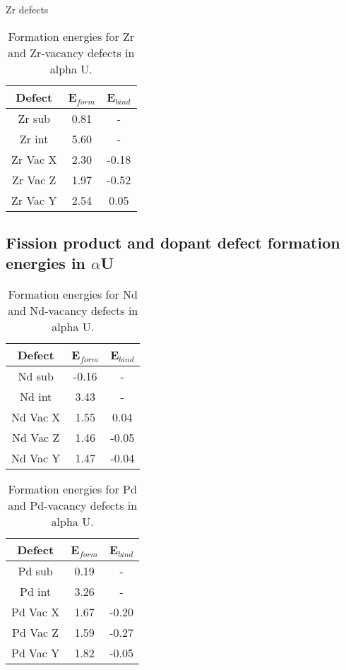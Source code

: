 \documentclass[review]{elsarticle}
\begin{document}
Zr defects

\begin{table}[h!]
\caption{Formation energies for Zr and Zr-vacancy defects in alpha U.}
\label{tab:Eforms}
\begin{center}
\begin{tabular}{|c|c|c|}
     \hline
      Defect & E$_{form}$ & E$_{bind}$ \\
     \hline
     Zr sub & 0.81 & - \\
     Zr int & 5.60 & - \\
     Zr Vac X & 2.30 & -0.18 \\
     Zr Vac Z & 1.97 & -0.52 \\
     Zr Vac Y & 2.54 & 0.05 \\
       \hline
\end{tabular}
\end{center}
\label{default}
\end{table}%

\FloatBarrier

\subsection{Fission product and dopant defect formation energies in $\alpha$U}

\begin{table}[h!]
\caption{Formation energies for Nd and Nd-vacancy defects in alpha U.}
\label{tab:Eforms}
\begin{center}
\begin{tabular}{|c|c|c|}
     \hline
      Defect & E$_{form}$ & E$_{bind}$ \\
     \hline
     Nd sub & -0.16 & - \\
     Nd int & 3.43 & - \\
     Nd Vac X & 1.55 & 0.04 \\
     Nd Vac Z & 1.46 & -0.05 \\
     Nd Vac Y & 1.47 & -0.04 \\
       \hline
\end{tabular}
\end{center}
\label{default}
\end{table}%

\begin{table}[h!]
\caption{Formation energies for Pd and Pd-vacancy defects in alpha U.}
\label{tab:Eforms}
\begin{center}
\begin{tabular}{|c|c|c|}
     \hline
      Defect & E$_{form}$ & E$_{bind}$ \\
     \hline
     Pd sub & 0.19 & - \\
     Pd int & 3.26 & - \\
     Pd Vac X & 1.67 & -0.20 \\
     Pd Vac Z & 1.59 & -0.27 \\
     Pd Vac Y & 1.82 & -0.05 \\
       \hline
\end{tabular}
\end{center}
\label{default}
\end{table}%
\end{document}
